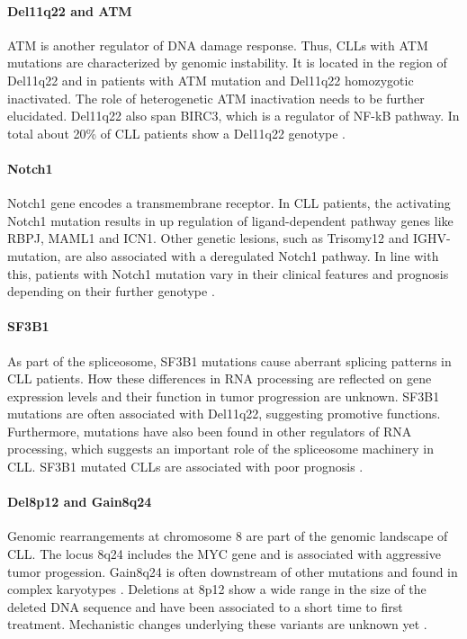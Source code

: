\paragraph{Del11q22 and ATM}
ATM is another regulator of DNA damage response. Thus, CLLs with ATM mutations are characterized by genomic instability. It is located in the region of Del11q22 and in patients with ATM mutation and Del11q22 homozygotic inactivated. The role of heterogenetic ATM inactivation needs to be further elucidated. Del11q22 also span BIRC3, which is a regulator of NF-kB pathway. In total about 20\% of CLL patients show a Del11q22 genotype \citep{Fabbri2016}.  

\paragraph{Notch1}
Notch1 gene encodes a transmembrane receptor. In CLL patients, the activating Notch1 mutation results in up regulation of ligand-dependent pathway genes like RBPJ, MAML1 and ICN1. Other genetic lesions, such as Trisomy12 and IGHV-mutation, are also associated with a deregulated Notch1 pathway. In line with this, patients with Notch1 mutation vary in their clinical features and prognosis depending on their further genotype \citep{Fabbri2016}.  

\paragraph{SF3B1}
As part of the spliceosome, SF3B1 mutations cause aberrant splicing patterns in CLL patients. How these differences in RNA processing are reflected on gene expression levels and their function in tumor progression are unknown. SF3B1 mutations are often associated with Del11q22, suggesting promotive functions. Furthermore, mutations have also been found in other regulators of RNA processing, which suggests an important role of the spliceosome machinery in CLL. SF3B1 mutated CLLs are associated with poor prognosis \citep{Fabbri2016}.

\paragraph{Del8p12 and Gain8q24}
Genomic rearrangements at chromosome 8 are part of the genomic landscape of CLL. The locus 8q24 includes the MYC gene and is associated with aggressive tumor progession. Gain8q24 is often downstream of other mutations and found in complex karyotypes \citep{Li2016}. Deletions at 8p12 show a wide range in the size of the deleted DNA sequence and have been associated to a short time to first treatment. Mechanistic changes underlying these variants are unknown yet \citep{Brown2012}. 


